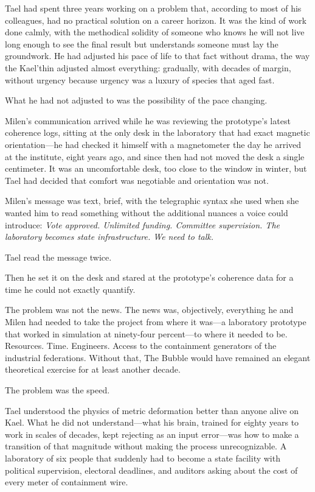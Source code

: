 \documentclass[11pt,a5paper,twoside]{book}
\begin{document}
Tael had spent three years working on a problem that, according to most of his colleagues, had no practical solution on a career horizon. It was the kind of work done calmly, with the methodical solidity of someone who knows he will not live long enough to see the final result but understands someone must lay the groundwork. He had adjusted his pace of life to that fact without drama, the way the Kael'thin adjusted almost everything: gradually, with decades of margin, without urgency because urgency was a luxury of species that aged fast.

What he had not adjusted to was the possibility of the pace changing.

Milen's communication arrived while he was reviewing the prototype's latest coherence logs, sitting at the only desk in the laboratory that had exact magnetic orientation—he had checked it himself with a magnetometer the day he arrived at the institute, eight years ago, and since then had not moved the desk a single centimeter. It was an uncomfortable desk, too close to the window in winter, but Tael had decided that comfort was negotiable and orientation was not.

Milen's message was text, brief, with the telegraphic syntax she used when she wanted him to read something without the additional nuances a voice could introduce: \textit{Vote approved. Unlimited funding. Committee supervision. The laboratory becomes state infrastructure. We need to talk.}

Tael read the message twice.

Then he set it on the desk and stared at the prototype's coherence data for a time he could not exactly quantify.

The problem was not the news. The news was, objectively, everything he and Milen had needed to take the project from where it was—a laboratory prototype that worked in simulation at ninety-four percent—to where it needed to be. Resources. Time. Engineers. Access to the containment generators of the industrial federations. Without that, The Bubble would have remained an elegant theoretical exercise for at least another decade.

The problem was the speed.

Tael understood the physics of metric deformation better than anyone alive on Kael. What he did not understand—what his brain, trained for eighty years to work in scales of decades, kept rejecting as an input error—was how to make a transition of that magnitude without making the process unrecognizable. A laboratory of six people that suddenly had to become a state facility with political supervision, electoral deadlines, and auditors asking about the cost of every meter of containment wire.
\end{document}
